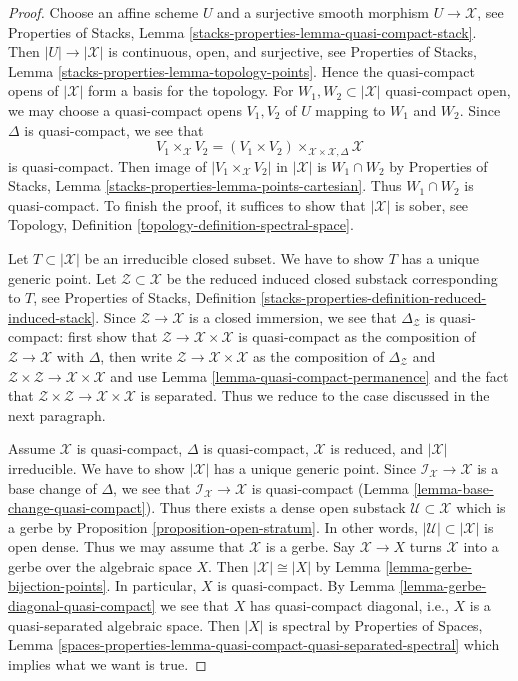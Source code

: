 \begin{proof}
Choose an affine scheme $U$ and a surjective smooth morphism
$U \to \mathcal{X}$, see
Properties of Stacks, Lemma \ref{stacks-properties-lemma-quasi-compact-stack}.
Then $|U| \to |\mathcal{X}|$ is continuous, open, and surjective, see
Properties of Stacks, Lemma \ref{stacks-properties-lemma-topology-points}.
Hence the quasi-compact opens of $|\mathcal{X}|$ form a basis
for the topology. For $W_1, W_2 \subset |\mathcal{X}|$ quasi-compact open,
we may choose a quasi-compact opens $V_1, V_2$ of $U$ mapping
to $W_1$ and $W_2$. Since $\Delta$ is quasi-compact,
we see that
$$
V_1 \times_\mathcal{X} V_2 =
(V_1 \times V_2) \times_{\mathcal{X} \times \mathcal{X}, \Delta} \mathcal{X}
$$
is quasi-compact. Then image of $|V_1 \times_\mathcal{X} V_2|$ in
$|\mathcal{X}|$ is $W_1 \cap W_2$ by
Properties of Stacks, Lemma \ref{stacks-properties-lemma-points-cartesian}.
Thus $W_1 \cap W_2$ is quasi-compact.
To finish the proof, it suffices to show that $|\mathcal{X}|$
is sober, see Topology, Definition \ref{topology-definition-spectral-space}.

\medskip\noindent
Let $T \subset |\mathcal{X}|$ be an irreducible closed subset.
We have to show $T$ has a unique generic point.
Let $\mathcal{Z} \subset \mathcal{X}$ be the reduced induced
closed substack corresponding to $T$, see
Properties of Stacks, Definition
\ref{stacks-properties-definition-reduced-induced-stack}.
Since $\mathcal{Z} \to \mathcal{X}$ is a closed immersion,
we see that $\Delta_\mathcal{Z}$ is quasi-compact:
first show that $\mathcal{Z} \to \mathcal{X} \times \mathcal{X}$
is quasi-compact as the composition of $\mathcal{Z} \to \mathcal{X}$
with $\Delta$, then write $\mathcal{Z} \to \mathcal{X} \times \mathcal{X}$
as the composition of $\Delta_\mathcal{Z}$ and
$\mathcal{Z} \times \mathcal{Z} \to \mathcal{X} \times \mathcal{X}$ and
use Lemma \ref{lemma-quasi-compact-permanence}
and the fact that
$\mathcal{Z} \times \mathcal{Z} \to \mathcal{X} \times \mathcal{X}$
is separated. Thus we reduce to the case discussed in the next
paragraph.

\medskip\noindent
Assume $\mathcal{X}$ is quasi-compact, $\Delta$ is quasi-compact,
$\mathcal{X}$ is reduced, and $|\mathcal{X}|$ irreducible.
We have to show $|\mathcal{X}|$ has a unique generic point.
Since $\mathcal{I}_\mathcal{X} \to \mathcal{X}$ is a base change of $\Delta$,
we see that $\mathcal{I}_\mathcal{X} \to \mathcal{X}$
is quasi-compact (Lemma \ref{lemma-base-change-quasi-compact}).
Thus there exists a dense open substack $\mathcal{U} \subset \mathcal{X}$
which is a gerbe by
Proposition \ref{proposition-open-stratum}.
In other words, $|\mathcal{U}| \subset |\mathcal{X}|$
is open dense. Thus we may assume that $\mathcal{X}$ is a gerbe.
Say $\mathcal{X} \to X$ turns $\mathcal{X}$ into a gerbe over the
algebraic space $X$. Then $|\mathcal{X}| \cong |X|$ by
Lemma \ref{lemma-gerbe-bijection-points}.
In particular, $X$ is quasi-compact.
By Lemma \ref{lemma-gerbe-diagonal-quasi-compact}
we see that $X$ has quasi-compact diagonal,
i.e., $X$ is a quasi-separated algebraic space.
Then $|X|$ is spectral by
Properties of Spaces, Lemma
\ref{spaces-properties-lemma-quasi-compact-quasi-separated-spectral}
which implies what we want is true.
\end{proof}

